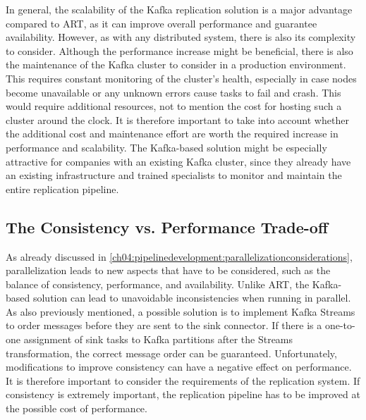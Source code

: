 In general, the scalability of the Kafka replication solution is a major advantage compared to \ac{ART}, as it can improve overall performance and guarantee availability. However, as with any distributed system, there is also its complexity to consider. Although the performance increase might be beneficial, there is also the maintenance of the Kafka cluster to consider in a production environment. This requires constant monitoring of the cluster's health, especially in case nodes become unavailable or any unknown errors cause tasks to fail and crash. This would require additional resources, not to mention the cost for hosting such a cluster around the clock. It is therefore important to take into account whether the additional cost and maintenance effort are worth the required increase in performance and scalability. The Kafka-based solution might be especially attractive for companies with an existing Kafka cluster, since they already have an existing infrastructure and trained specialists to monitor and maintain the entire replication pipeline.

\subsection{The Consistency vs. Performance Trade-off}
As already discussed in \ref{ch04:pipelinedevelopment:parallelizationconsiderations}, parallelization leads to new aspects that have to be considered, such as the balance of consistency, performance, and availability. Unlike \ac{ART}, the Kafka-based solution can lead to unavoidable inconsistencies when running in parallel. As also previously mentioned, a possible solution is to implement Kafka Streams to order messages before they are sent to the sink connector. If there is a one-to-one assignment of sink tasks to Kafka partitions after the Streams transformation, the correct message order can be guaranteed. Unfortunately, modifications to improve consistency can have a negative effect on performance. It is therefore important to consider the requirements of the replication system. If consistency is extremely important, the replication pipeline has to be improved at the possible cost of performance.

